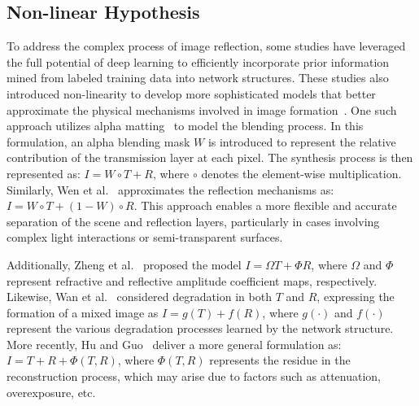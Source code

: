 \subsection{Non-linear Hypothesis}
To address the complex process of image reflection, some studies have leveraged the full potential of deep learning to efficiently incorporate prior information mined from labeled training data into network structures. These studies also introduced non-linearity to develop more sophisticated models that better approximate the physical mechanisms involved in image formation~\cite{dong2021location, li2020single, wei2019single}. One such approach utilizes alpha matting~\cite{dong2021location} to model the blending process. In this formulation, an alpha blending mask $W$ is introduced to represent the relative contribution of the transmission layer at each pixel. The synthesis process is then represented as: $I = W \circ T + R$, where $\circ$ denotes the element-wise multiplication. Similarly, Wen et al.~\cite{wen2019single} approximates the reflection mechanisms as: $I = W \circ T + (1 - W) \circ R$. This approach enables a more flexible and accurate separation of the scene and reflection layers, particularly in cases involving complex light interactions or semi-transparent surfaces. 

Additionally, Zheng et al.~\cite{zheng2021single} proposed the model $I = \Omega T + \Phi R$, where $\Omega$ and $\Phi$ represent refractive and reflective amplitude coefficient maps, respectively. Likewise, Wan et al.~\cite{wan2020reflection} considered degradation in both $T$ and $R$, expressing the formation of a mixed image as $I = g(T) + f(R)$, where $g(\cdot)$ and $f(\cdot)$ represent the various degradation processes learned by the network structure. More recently, Hu and Guo~\cite{hu2023single} deliver a more general formulation as: $I = T + R + \Phi(T, R)$, where $\Phi(T, R)$ represents the residue in the reconstruction process, which may arise due to factors such as attenuation, overexposure, etc.
